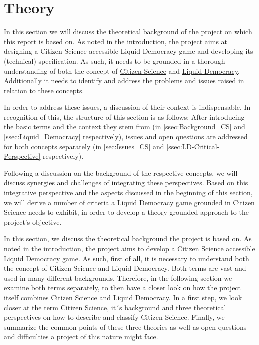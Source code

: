 \chapter{Theory}
\label{ch:Theory}

In this section we will discuss the theoretical background of the project on which this report is based on. As noted in the introduction, the project aims at designing a Citizen Science accessible Liquid Democracy game and developing its (technical) specification. As such, it needs to be grounded in a thorough understanding of both the concept of \hyperref[sec:Theory_CS]{Citizen Science} and \hyperref[sec:Liquid_Democracy]{Liquid Democracy}. Additionally it needs to identify and address the problems and issues raised in relation to these concepts. 

In order to address these issues, a discussion of their context is indispensable. In recognition of this, the structure of this section is as follows:
After introducing the basic terms and the context they stem from (in \ref{ssec:Background_CS} and \ref{ssec:Liquid_Democracy}
respectively), issues and open questions are addressed for both concepts separately (in \ref{sec:Issues_CS} and \ref{ssec:LD-Critical-Perspective} respectively). 

Following a discussion on the background of the respective concepts, we will \hyperref[sec:Integration_CSLD]{discuss synergies and challenges} of integrating these perspectives. Based on this integrative perspective and the aspects discussed in the beginning of this section, we will \hyperref[sec:Criteria]{derive a number of criteria} a Liquid Democracy game grounded in Citizen Science needs to exhibit, in order to develop a theory-grounded approach to the project's objective.


In this section, we discuss the theoretical background the project is based on. As noted in the introduction, the project aims to develop a Citizen Science accessible Liquid Democracy game. As such, first of all, it is necessary to understand both the concept of Citizen Science and Liquid Democracy. Both terms are vast and used in many different backgrounds. Therefore, in the following section we examine both terms separately, to then have a closer look on how the project itself combines Citizen Science and Liquid Democracy. In a first step, we look closer at the term Citizen Science, it´s background and three theoretical perspectives on how to describe and classify Citizen Science. Finally, we summarize the common points of these three theories as well as open questions and difficulties a project of this nature might face.



